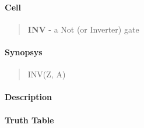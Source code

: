 \label{INV}
\paragraph{Cell}
\begin{quote}
    \textbf{INV} - a Not (or Inverter) gate
\end{quote}

\paragraph{Synopsys}
\begin{quote}
    INV(Z, A)
\end{quote}

\paragraph{Description}



\paragraph{Truth Table}


